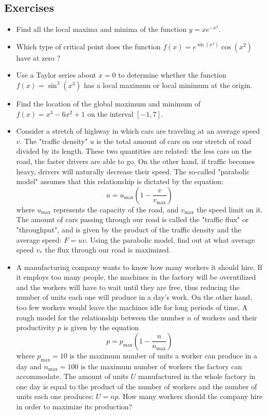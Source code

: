 \documentclass[twoside,openright,titlepage,a4paper]{book}
\begin{document}
\begin{sloppypar}
\subsection{Exercises}
\begin{itemize}
\item Find all the local maxima and minima of the function $y=x e^{-x^2}$.
\item Which type of critical point does the function $f(x) = e^{\sin(x^4)}\cos(x^2)$ have at zero ?
\item Use a Taylor series about $x=0$ to determine whether the function $f(x) = \sin^3(x^3)$ has a local maximum or local minimum at the origin.
\item Find the location of the global maximum and minimum of $f(x) = x^3-6x^2+1$ on the interval $ [-1,7] $.
\item Consider a stretch of highway in which cars are traveling at an average speed $v$. The "traffic density" $u$ is the total amount of cars on our stretch of road divided by its length. These two quantities are related: the less cars on the road, the faster drivers are able to go. On the other hand, if traffic becomes heavy, drivers will naturally decrease their speed. The so-called "parabolic model" assumes that this relationship is dictated by the equation: \[ u = u_\mathrm{max} \left( 1 - \frac{v}{v_\mathrm{max}} \right) \] where $u_\mathrm{max}$ represents the capacity of the road, and $v_\mathrm{max}$ the speed limit on it. The amount of cars passing through our road is called the "traffic flux" or "throughput", and is given by the product of the traffic density and the average speed: $F = uv$. Using the parabolic model, find out at what average speed $v_\ast$ the flux through our road is maximized.
\item A manufacturing company wants to know how many workers it should hire. If it employs too many people, the machines in the factory will be overutilized and the workers will have to wait until they are free, thus reducing the number of units each one will produce in a day's work. On the other hand, too few workers would leave the machines idle for long periods of time. A rough model for the relationship between the number $n$ of workers and their productivity $p$ is given by the equation \[ p = p_\mathrm{max} \left( 1 - \frac{n}{n_\mathrm{max}} \right) \] where $p_\mathrm{max} = 10$ is the maximum number of units a worker can produce in a day and $n_\mathrm{max} = 100$ is the maximum number of workers the factory can accommodate. The amount of units $U$ manufactured in the whole factory in one day is equal to the product of the number of workers and the number of units each one produces: $ U = np $. How many workers should the company hire in order to maximize its production?

\end{itemize}
\end{sloppypar}
\end{document}
